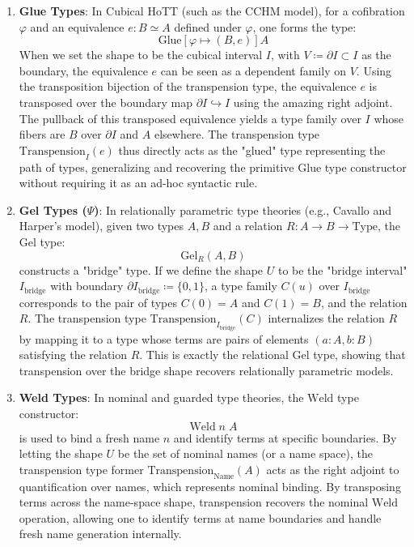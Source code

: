 \documentclass{article}
\begin{document}
\begin{enumerate}
  \item \textbf{Glue Types}: In Cubical HoTT (such as the CCHM model), for a cofibration $\varphi$ and an equivalence $e : B \simeq A$ defined under $\varphi$, one forms the type:
    \[
    \mathrm{Glue}[\varphi \mapsto (B, e)] A
    \]
    When we set the shape to be the cubical interval $I$, with $V \coloneqq \partial I \subset I$ as the boundary, the equivalence $e$ can be seen as a dependent family on $V$. Using the transposition bijection of the transpension type, the equivalence $e$ is transposed over the boundary map $\partial I \hookrightarrow I$ using the amazing right adjoint. The pullback of this transposed equivalence yields a type family over $I$ whose fibers are $B$ over $\partial I$ and $A$ elsewhere. The transpension type $\mathrm{Transpension}_I(e)$ thus directly acts as the "glued" type representing the path of types, generalizing and recovering the primitive $\mathrm{Glue}$ type constructor without requiring it as an ad-hoc syntactic rule.
  \item \textbf{Gel Types ($\Psi$)}: In relationally parametric type theories (e.g., Cavallo and Harper's model), given two types $A, B$ and a relation $R : A \to B \to \mathrm{Type}$, the $\mathrm{Gel}$ type:
    \[
    \mathrm{Gel}_R(A, B)
    \]
    constructs a "bridge" type. If we define the shape $U$ to be the "bridge interval" $I_{\mathrm{bridge}}$ with boundary $\partial I_{\mathrm{bridge}} \coloneqq \{0, 1\}$, a type family $C(u)$ over $I_{\mathrm{bridge}}$ corresponds to the pair of types $C(0) = A$ and $C(1) = B$, and the relation $R$. The transpension type $\mathrm{Transpension}_{I_{\mathrm{bridge}}}(C)$ internalizes the relation $R$ by mapping it to a type whose terms are pairs of elements $(a : A, b : B)$ satisfying the relation $R$. This is exactly the relational $\mathrm{Gel}$ type, showing that transpension over the bridge shape recovers relationally parametric models.
  \item \textbf{Weld Types}: In nominal and guarded type theories, the $\mathrm{Weld}$ type constructor:
    \[
    \mathrm{Weld} \; n \; A
    \]
    is used to bind a fresh name $n$ and identify terms at specific boundaries. By letting the shape $U$ be the set of nominal names (or a name space), the transpension type former $\mathrm{Transpension}_{\mathrm{Name}}(A)$ acts as the right adjoint to quantification over names, which represents nominal binding. By transposing terms across the name-space shape, transpension recovers the nominal $\mathrm{Weld}$ operation, allowing one to identify terms at name boundaries and handle fresh name generation internally.
\end{enumerate}
\end{document}
